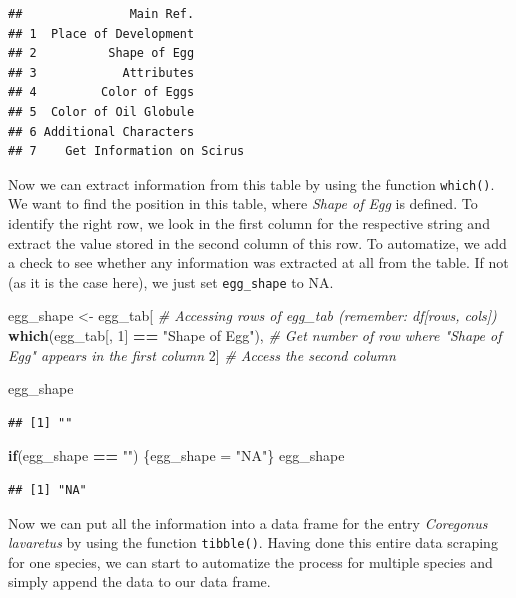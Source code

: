 \documentclass[
]{book}
\newenvironment{Shaded}{\begin{snugshade}}{\end{snugshade}}
\newcommand{\CommentTok}[1]{\textcolor[rgb]{0.56,0.35,0.01}{\textit{#1}}}
\newcommand{\ControlFlowTok}[1]{\textcolor[rgb]{0.13,0.29,0.53}{\textbf{#1}}}
\newcommand{\DecValTok}[1]{\textcolor[rgb]{0.00,0.00,0.81}{#1}}
\newcommand{\KeywordTok}[1]{\textcolor[rgb]{0.13,0.29,0.53}{\textbf{#1}}}
\newcommand{\NormalTok}[1]{#1}
\newcommand{\OperatorTok}[1]{\textcolor[rgb]{0.81,0.36,0.00}{\textbf{#1}}}
\newcommand{\StringTok}[1]{\textcolor[rgb]{0.31,0.60,0.02}{#1}}
\begin{document}
\begin{verbatim}
##               Main Ref.       
## 1  Place of Development       
## 2          Shape of Egg       
## 3            Attributes       
## 4         Color of Eggs       
## 5  Color of Oil Globule       
## 6 Additional Characters       
## 7    Get Information on Scirus
\end{verbatim}

Now we can extract information from this table by using the function \texttt{which()}. We want to find the position in this table, where \emph{Shape of Egg} is defined. To identify the right row, we look in the first column for the respective string and extract the value stored in the second column of this row. To automatize, we add a check to see whether any information was extracted at all from the table. If not (as it is the case here), we just set \texttt{egg\_shape} to NA.

\begin{Shaded}
\begin{Highlighting}[]
\NormalTok{egg_shape <-}\StringTok{ }\NormalTok{egg_tab[                     }\CommentTok{# Accessing rows of egg_tab (remember: df[rows, cols])}
  \KeywordTok{which}\NormalTok{(egg_tab[, }\DecValTok{1}\NormalTok{] }\OperatorTok{==}\StringTok{ "Shape of Egg"}\NormalTok{),  }\CommentTok{# Get number of row where "Shape of Egg" appears in the first column}
  \DecValTok{2}\NormalTok{]                                      }\CommentTok{# Access the second column}

\NormalTok{egg_shape}
\end{Highlighting}
\end{Shaded}

\begin{verbatim}
## [1] ""
\end{verbatim}

\begin{Shaded}
\begin{Highlighting}[]
\ControlFlowTok{if}\NormalTok{(egg_shape }\OperatorTok{==}\StringTok{ ""}\NormalTok{) \{egg_shape =}\StringTok{ "NA"}\NormalTok{\}}
\NormalTok{egg_shape}
\end{Highlighting}
\end{Shaded}

\begin{verbatim}
## [1] "NA"
\end{verbatim}

Now we can put all the information into a data frame for the entry \emph{Coregonus lavaretus} by using the function \texttt{tibble()}. Having done this entire data scraping for one species, we can start to automatize the process for multiple species and simply append the data to our data frame.
\end{document}

